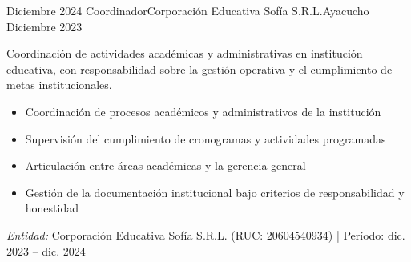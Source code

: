 \experience
{Diciembre 2024} {Coordinador}{Corporación Educativa Sofía S.R.L.}{Ayacucho}
{Diciembre 2023} {
	Coordinación de actividades académicas y administrativas en institución educativa, con responsabilidad sobre la gestión operativa y el cumplimiento de metas institucionales.
	\begin{itemize}
		\item Coordinación de procesos académicos y administrativos de la institución
		\item Supervisión del cumplimiento de cronogramas y actividades programadas
		\item Articulación entre áreas académicas y la gerencia general
		\item Gestión de la documentación institucional bajo criterios de responsabilidad y honestidad
	\end{itemize}
}
{\footnotesize{\emph{Entidad:} Corporación Educativa Sofía S.R.L. (RUC: 20604540934) | Período: dic. 2023 -- dic. 2024}}
